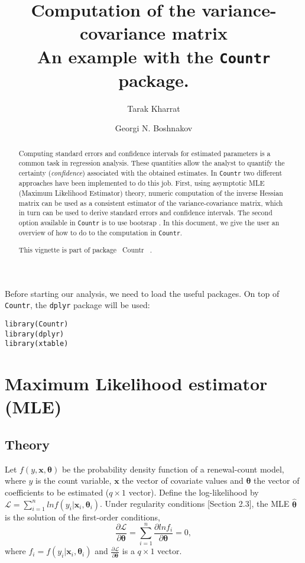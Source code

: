 \documentclass[a4paper,twoside,11pt]{article}
\author[1]{Tarak Kharrat}
\author[2]{Georgi N. Boshnakov}
\affil[1]{Salford Business School, University of Salford, UK.}
\affil[2]{School of Mathematics, University of Manchester, UK.}
\date{}
\title{Computation of the variance-covariance matrix\\\medskip
\large An example with the \texttt{Countr} package.}
\begin{document}
\maketitle
\begin{abstract}
Computing standard errors and confidence intervals for estimated parameters is a
common task in regression analysis. These quantities allow the analyst to
quantify the certainty (\emph{confidence}) associated with the obtained estimates. In
\texttt{Countr} two different approaches have been implemented to do this job. First, using
asymptotic MLE (Maximum Likelihood Estimator) theory, numeric computation of the
inverse Hessian matrix can be used as a consistent estimator of the
variance-covariance matrix, which in turn can be used to derive standard errors
and confidence intervals. The second option available in \texttt{Countr} is to use
bootsrap \citep{efron1979bootstrap}. In this document, we give the user an
overview of how to do to the computation in \texttt{Countr}.

This vignette is part of package ~Countr~ \citep[see][]{CountrJssArticle}.
\end{abstract}

Before starting our analysis, we need to load the useful packages. On top of
\texttt{Countr}, the \texttt{dplyr} package \citep{dplyr2016} will be used:
\begin{verbatim}
library(Countr)
library(dplyr)
library(xtable)
\end{verbatim}


\section{Maximum Likelihood estimator (MLE)}
\label{sec:org00b2160}

\subsection{Theory}
\label{sec:org3f9bf68}

Let \(f(y, \mathbf{x}, \bm{\theta})\) be the probability density function of a
renewal-count model, where \(y\) is the count variable, \(\mathbf{x}\) the vector of
covariate values and \(\bm{\theta}\) the vector of coefficients to be
estimated (\(q \times 1\) vector). Define the log-likelihood by \(\mathcal{L} =
\sum_{i=1}^{n} ln f(y_i|\mathbf{x}_i, \bm{\theta}_i)\). Under regularity
conditions  \citep[see for example]{cameron2013regression}[Section 2.3], the MLE
\(\bm{\hat{\theta}}\) is the solution of the first-order conditions,
\begin{equation}      
     \frac{\partial \mathcal{L}}{\partial \bm{\theta}} 
     = \sum_{i=1}^{n} \frac{\partial ln f_i}{\partial \bm{\theta}} = 0 
     ,
\end{equation}        
where \(f_i = f(y_i|\mathbf{x}_i, \bm{\theta}_i)\) and \(\frac{\partial
\mathcal{L}}{\partial \bm{\theta}}\) is a \(q \times 1\) vector.
\end{document}
